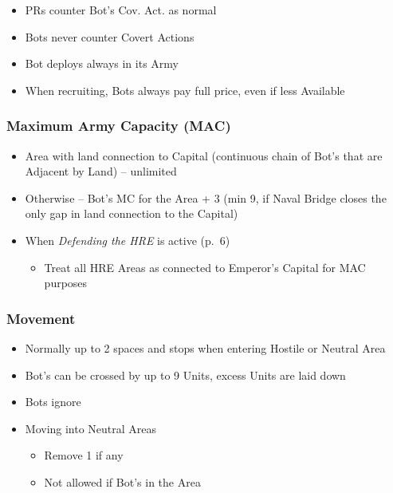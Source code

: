 \documentclass[10pt]{article}
\begin{document}
\begin{itemize}
	\item PRs counter Bot's Cov. Act. as normal
	\item Bots never counter Covert Actions 
\end{itemize}

\begin{itemize}
	\item Bot deploys always in its Army
	\item When recruiting, Bots always pay full \botpower price, even if less Available \manpower
\end{itemize}

\subsubsection*{Maximum Army Capacity (MAC)}
\begin{itemize}
	\item Area with land connection to Capital (continuous chain of Bot's \towns that are Adjacent by Land) -- unlimited
	\item Otherwise -- Bot's MC for the Area + 3 (min 9, if Naval Bridge closes the only gap in land connection to the Capital)
	\item When \emph{Defending the HRE} is active (p.~6)
	\begin{itemize}
		\item Treat all HRE Areas as connected to Emperor's Capital for MAC purposes
	\end{itemize}
\end{itemize}

\subsubsection*{Movement}
\begin{itemize}
	\item Normally up to 2 spaces and stops when entering Hostile or Neutral Area
	\item Bot's  can be crossed by up to 9 Units, excess Units are laid down
	\item Bots ignore 
	\item Moving into Neutral Areas
	\begin{itemize}
		\item Remove 1 \influence if any
		\item Not allowed if Bot's \claim in the Area
	\end{itemize}
\end{itemize}
\end{document}
